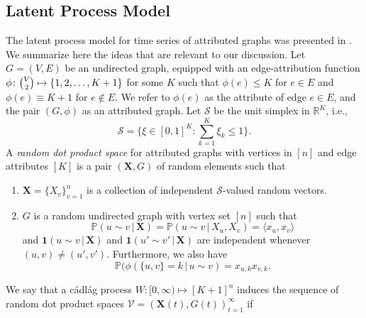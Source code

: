 \documentclass[10pt,journal,compsoc]{IEEEtran}
\theoremstyle{definition}
\begin{document}
\subsection{Latent Process Model}
\label{sec:latent-process-model}
The latent process model for time series of attributed graphs was
presented in \cite{lee11}. We summarize here the ideas that are
relevant to our discussion.  Let $G = (V,E)$ be an undirected graph,
equipped with an edge-attribution function $\phi \colon \tbinom{V}{2}
\mapsto \{1,2,\dots, K+1\}$ for some $K$ such that $\phi(e) \leq K$
for $e \in E$ and $\phi(e) \equiv K+1$ for $e \not \in E$. We refer to
$\phi(e)$ as the attribute of edge $e \in E$, and the pair $(G,\phi)$
as an attributed graph. Let $\mathscr{S}$ be the unit simplex in
$\mathbb{R}^{K}$, i.e.,
\begin{equation}
  \mathscr{S} = \{ \xi \in [0,1]^{K}
  \colon \sum_{k = 1}^{K} \xi_k \leq 1 \}.
\end{equation}
A {\em random dot product space} for attributed graphs with vertices
in $[n]$ and edge attributes $[K]$ is a pair $(\mathbf{X},G)$ of
random elements such that
\begin{enumerate}
\item $\mathbf{X} = \{X_v\}_{v = 1}^{n}$ is a collection of
  independent $\mathscr{S}$-valued random vectors.
\item $G$ is a random undirected graph with vertex set $[n]$ such that
  \begin{equation}
    \label{eq:1}
    \mathbb{P}(u \sim v \,|\, \mathbf{X}) = \mathbb{P}(u \sim v \, |
    \, X_u,X_v) = \langle x_u, x_v \rangle
  \end{equation}
  and $\bm{1}(u \sim v \,|\, \mathbf{X})$ and $\bm{1}(u' \sim
  v' \,|\, \mathbf{X})$ are independent whenever $(u,v) \not =
  (u',v')$. Furthermore, we also have 
  \begin{equation*}
    \mathbb{P}(\phi(\{u,v\} = k \, | \, u \sim
    v) = x_{u,k} x_{v,k}. 
  \end{equation*}
\end{enumerate}
We say that a c\'{a}dl\'{a}g process $W \colon [0,\infty) \mapsto
[K+1]^{n}$ induces the sequence of random dot product spaces
$\mathscr{V} = (\mathbf{X}(t), G(t))_{t = 1}^{\infty}$ if
\end{document}
